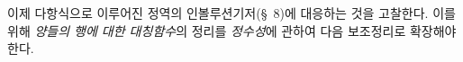 
이제 다항식으로 이루어진 정역의 인볼루션기저(\S\ 8)에 대응하는 것을 고찰한다. 이를 위해 \emph{양들의 행에 대한 대칭함수}의 정리를 \emph{정수성}에 관하여 다음 보조정리로 확장해야 한다.

